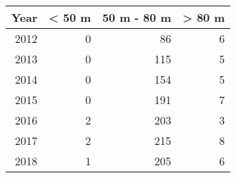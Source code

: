 
\begin{tabular}{r|r|r|r}
\hline
Year & < 50 m & 50 m - 80 m & > 80 m\\
\hline
2012 & 0 & 86 & 6\\
\hline
2013 & 0 & 115 & 5\\
\hline
2014 & 0 & 154 & 5\\
\hline
2015 & 0 & 191 & 7\\
\hline
2016 & 2 & 203 & 3\\
\hline
2017 & 2 & 215 & 8\\
\hline
2018 & 1 & 205 & 6\\
\hline
\end{tabular}